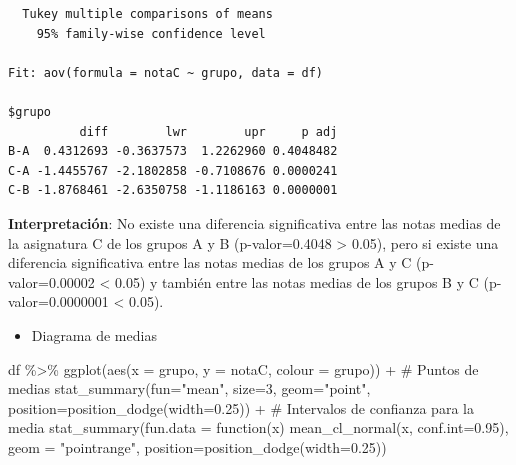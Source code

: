 \documentclass[
  a4paper,
]{scrreport}
\newenvironment{Shaded}{\begin{snugshade}}{\end{snugshade}}
\newcommand{\AttributeTok}[1]{\textcolor[rgb]{0.40,0.45,0.13}{#1}}
\newcommand{\CommentTok}[1]{\textcolor[rgb]{0.37,0.37,0.37}{#1}}
\newcommand{\ControlFlowTok}[1]{\textcolor[rgb]{0.00,0.23,0.31}{#1}}
\newcommand{\DecValTok}[1]{\textcolor[rgb]{0.68,0.00,0.00}{#1}}
\newcommand{\FloatTok}[1]{\textcolor[rgb]{0.68,0.00,0.00}{#1}}
\newcommand{\FunctionTok}[1]{\textcolor[rgb]{0.28,0.35,0.67}{#1}}
\newcommand{\NormalTok}[1]{\textcolor[rgb]{0.00,0.23,0.31}{#1}}
\newcommand{\SpecialCharTok}[1]{\textcolor[rgb]{0.37,0.37,0.37}{#1}}
\newcommand{\StringTok}[1]{\textcolor[rgb]{0.13,0.47,0.30}{#1}}
\providecommand{\tightlist}{%
  \setlength{\itemsep}{0pt}\setlength{\parskip}{0pt}}\usepackage{longtable,booktabs,array}
\theoremstyle{definition}
\theoremstyle{definition}
\theoremstyle{remark}
\begin{document}
\begin{verbatim}
  Tukey multiple comparisons of means
    95% family-wise confidence level

Fit: aov(formula = notaC ~ grupo, data = df)

$grupo
          diff        lwr        upr     p adj
B-A  0.4312693 -0.3637573  1.2262960 0.4048482
C-A -1.4455767 -2.1802858 -0.7108676 0.0000241
C-B -1.8768461 -2.6350758 -1.1186163 0.0000001
\end{verbatim}

\textbf{Interpretación}: No existe una diferencia significativa entre
las notas medias de la asignatura C de los grupos A y B (p-valor=0.4048
\textgreater{} 0.05), pero si existe una diferencia significativa entre
las notas medias de los grupos A y C (p-valor=0.00002 \textless{} 0.05)
y también entre las notas medias de los grupos B y C (p-valor=0.0000001
\textless{} 0.05).

\begin{itemize}
\tightlist
\item
  Diagrama de medias
\end{itemize}

\begin{Shaded}
\begin{Highlighting}[]
\NormalTok{df }\SpecialCharTok{\%\textgreater{}\%} \FunctionTok{ggplot}\NormalTok{(}\FunctionTok{aes}\NormalTok{(}\AttributeTok{x =}\NormalTok{ grupo, }\AttributeTok{y =}\NormalTok{ notaC, }\AttributeTok{colour =}\NormalTok{ grupo)) }\SpecialCharTok{+} 
  \CommentTok{\# Puntos de medias}
  \FunctionTok{stat\_summary}\NormalTok{(}\AttributeTok{fun=}\StringTok{"mean"}\NormalTok{, }\AttributeTok{size=}\DecValTok{3}\NormalTok{,  }\AttributeTok{geom=}\StringTok{"point"}\NormalTok{, }\AttributeTok{position=}\FunctionTok{position\_dodge}\NormalTok{(}\AttributeTok{width=}\FloatTok{0.25}\NormalTok{)) }\SpecialCharTok{+} 
  \CommentTok{\# Intervalos de confianza para la media}
  \FunctionTok{stat\_summary}\NormalTok{(}\AttributeTok{fun.data =} \ControlFlowTok{function}\NormalTok{(x) }\FunctionTok{mean\_cl\_normal}\NormalTok{(x, }\AttributeTok{conf.int=}\FloatTok{0.95}\NormalTok{), }\AttributeTok{geom =} \StringTok{"pointrange"}\NormalTok{, }\AttributeTok{position=}\FunctionTok{position\_dodge}\NormalTok{(}\AttributeTok{width=}\FloatTok{0.25}\NormalTok{)) }
\end{Highlighting}
\end{Shaded}
\end{document}
